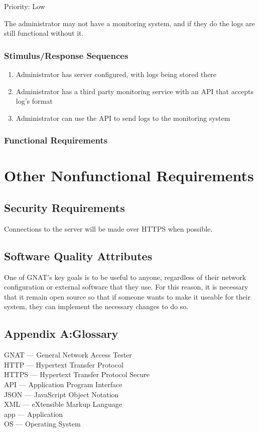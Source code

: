 \documentclass{scrreprt}
\begin{document}
Priority: Low

The administrator may not have a monitoring system, and if they do the logs are still functional without it.

\subsection{Stimulus/Response Sequences}

\begin{enumerate}
\item Administrator has server configured, with logs being stored there
\item Administrator has a third party monitoring service with an API that accepts log's format
  \item Administrator can use the API to send logs to the monitoring system

  \end{enumerate}
\subsection{Functional Requirements}


\chapter{Other Nonfunctional Requirements}

\section{Security Requirements}

Connections to the server will be made over HTTPS when possible.

\section{Software Quality Attributes}
One of GNAT's key goals is to be useful to anyone, regardless of their network configuration or external software that they use.  For this reason, it is necessary that it remain open source so that if someone wants to make it useable for their system, they can implement the necessary changes to do so.

\section{Appendix A:\@ Glossary}
 GNAT --- General Network Access Tester\\
 HTTP --- Hypertext Transfer Protocol\\
 HTTPS --- Hypertext Transfer Protocol Secure\\
 API --- Application Program Interface\\
 JSON --- JavaScript Object Notation\\
 XML --- eXtensible Markup Language\\
 app --- Application\\
 OS --- Operating System\\
\end{document}
